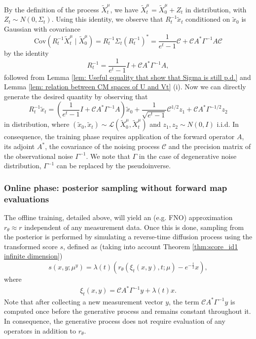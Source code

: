 \documentclass[10pt]{article} %
\theoremstyle{plain}
\theoremstyle{definition}
\theoremstyle{remark}
\begin{document}
By the definition of the process $\widetilde{X}_t^{\mu}$, we have $\widetilde{X}_t^{\mu} = \widetilde{X}^{\mu}_0 + Z_t$ in distribution, with $Z_t \sim N(0, \Sigma_t)$. 
Using this identity, we observe that $R_t^{-1} \tilde x_t$ conditioned on $\tilde x_0$ is Gaussian with covariance
$$ \text{Cov}(R_t^{-1}\widetilde{X}_t^{\mu} \; | \; \widetilde{X}^{\mu}_0) = R_t^{-1} \Sigma_t \left(R_t^{-1}\right)^* = \frac{1}{e^t-1}{\mathcal C} + {\mathcal C} A^* \Gamma^{-1}A {\mathcal C}$$
by the identity $$R_t^{-1} = \frac{1}{e^t-1}I + {\mathcal C} A^* \Gamma^{-1}A,$$
followed from Lemma \ref{lem: Useful equality that show that Sigma is still p.d.} and Lemma \ref{lem: relation between CM spaces of U and Vt} (i).
Now we can directly generate the desired quantity by observing that
$$R_t^{-1} \tilde x_t = \left(\frac{1}{e^t-1}I + {\mathcal C} A^* \Gamma^{-1}A\right) \tilde x_0 + \frac{1}{\sqrt{e^t-1}}{\mathcal C}^{1/2} z_1 + {\mathcal C} A^* \Gamma^{-1/2} z_2 $$
in distribution, where $(\tilde x_0, \tilde x_t) \sim {\mathcal L}(\widetilde{X}^{\mu}_0, \widetilde{X}_t^{\mu})$ and $z_1, z_2 \sim N(0, I)$ i.i.d.
In consequence, the training phase requires application of the forward operator $A$, its adjoint $A^*$, the covariance of the noising process ${\mathcal C}$ and the precision matrix of the observational noise $\Gamma^{-1}$. We note that $\Gamma$ in the case of degenerative noise distribution, $\Gamma^{-1}$ can be replaced by the pseudoinverse.
%
\subsubsection{Online phase: posterior sampling without forward map evaluations}
The offline training, detailed above, will yield an (e.g. FNO) approximation $r_\theta \approx r$ independent of any measurement data. Once this is done, sampling from the posterior is performed by simulating a reverse-time diffusion process using the transformed score $s$, defined as (taking into account Theorem \ref{thm:score_id1 infinite dimension})
$$ s(x,y; \mu^y) = \lambda(t) \left(r_\theta(\xi_t(x,y), t; \mu) - e^{-\frac t2} x\right), $$
where 
\begin{eqnarray*}
    \xi_t(x,y) = {\mathcal C}A^* \Gamma^{-1}y + \lambda(t) x.
\end{eqnarray*}
Note that after collecting a new measurement vector $y$, the term ${\mathcal C}A^* \Gamma^{-1}y$ is computed once before the generative process and remains constant throughout it. In consequence, the generative process does not require evaluation of any operators in addition to $r_\theta$.
\end{document}
